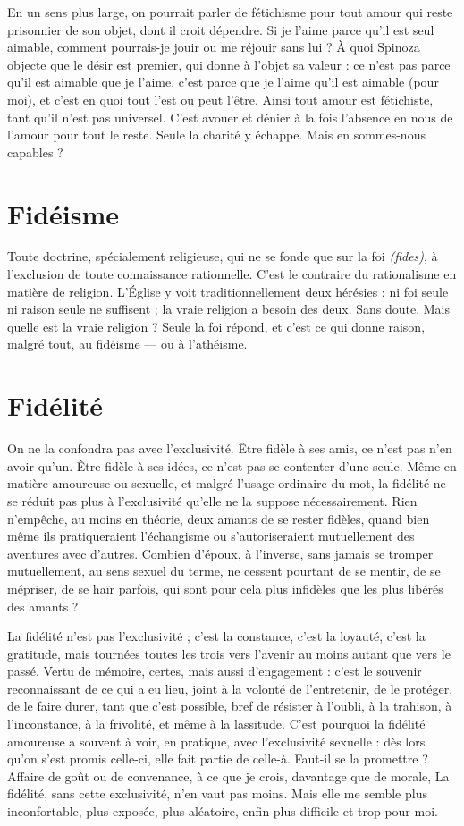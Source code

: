 En un sens plus large, on pourrait parler de fétichisme pour tout amour qui
reste prisonnier de son objet, dont il croit dépendre. Si je l'aime parce qu'il est
seul aimable, comment pourrais-je jouir ou me réjouir sans lui ? À quoi Spinoza
objecte que le désir est premier, qui donne à l’objet sa valeur : ce n’est pas
parce qu’il est aimable que je l’aime, c’est parce que je l’aime qu’il est aimable
(pour moi), et c’est en quoi tout l’est ou peut l’être. Ainsi tout amour est fétichiste,
tant qu’il n’est pas universel. C’est avouer et dénier à la fois l’absence en
nous de l’amour pour tout le reste. Seule la charité y échappe. Mais en sommes-nous
capables ?

\section{Fidéisme}
Toute doctrine, spécialement religieuse, qui ne se fonde que sur
la foi {\it (fides)}, à l'exclusion de toute connaissance rationnelle.
C’est le contraire du rationalisme en matière de religion. L'Église y voit traditionnellement
deux hérésies : ni foi seule ni raison seule ne suffisent ; la vraie
religion a besoin des deux. Sans doute. Mais quelle est la vraie religion ? Seule
la foi répond, et c’est ce qui donne raison, malgré tout, au fidéisme — ou à
l’athéisme.

\section{Fidélité}
On ne la confondra pas avec l'exclusivité. Être fidèle à ses amis,
ce n’est pas n’en avoir qu’un. Être fidèle à ses idées, ce n’est pas
se contenter d’une seule. Même en matière amoureuse ou sexuelle, et malgré
l'usage ordinaire du mot, la fidélité ne se réduit pas plus à l'exclusivité qu’elle
ne la suppose nécessairement. Rien n'empêche, au moins en théorie, deux
amants de se rester fidèles, quand bien même ils pratiqueraient l’échangisme ou
s’autoriseraient mutuellement des aventures avec d’autres. Combien d’époux, à
l'inverse, sans jamais se tromper mutuellement, au sens sexuel du terme, ne cessent
pourtant de se mentir, de se mépriser, de se haïr parfois, qui sont pour cela
plus infidèles que les plus libérés des amants ?

La fidélité n’est pas l’exclusivité ; c’est la constance, c’est la loyauté, c’est la
gratitude, mais tournées toutes les trois vers l’avenir au moins autant que vers
le passé. Vertu de mémoire, certes, mais aussi d’engagement : c’est le souvenir
reconnaissant de ce qui a eu lieu, joint à la volonté de l’entretenir, de le protéger,
de le faire durer, tant que c’est possible, bref de résister à l'oubli, à la trahison,
à l’inconstance, à la frivolité, et même à la lassitude. C’est pourquoi la
fidélité amoureuse a souvent à voir, en pratique, avec l'exclusivité sexuelle : dès
lors qu'on s’est promis celle-ci, elle fait partie de celle-à. Faut-il se la
promettre ? Affaire de goût ou de convenance, à ce que je crois, davantage que
de morale, La fidélité, sans cette exclusivité, n’en vaut pas moins. Mais elle me
semble plus inconfortable, plus exposée, plus aléatoire, enfin plus difficile et
trop pour moi.

